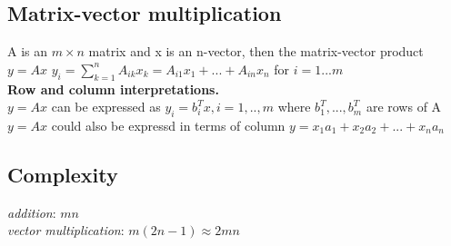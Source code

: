 \subsection{Matrix-vector multiplication}
A is an $m\times n$ matrix and x is an n-vector, then the matrix-vector product $y = Ax$
$y_i = \sum_{k=1}^n A_{ik} x_k =A_{i1}x_1 +...+A_{in}x_n$ for $i=1...m$\\
\textbullet \textbf{Row and column interpretations.}\\
$y = Ax$ can be expressed as $y_i=b^T_ix, i=1,..,m$ where $b^T_1,...,b^T_m$ are rows of A\\
\textbullet $y = Ax$ could also be expressd in terms of column
$y = x_1a_1 + x_2a_2 +...+ x_na_n$
\subsection{Complexity}
\textit{addition}: $mn$\\
\textit{vector multiplication}: $m(2n-1) \approx 2mn$